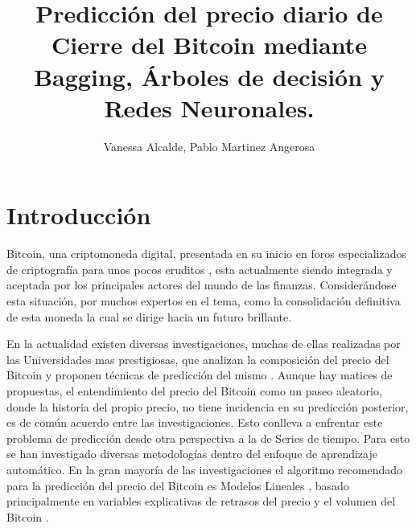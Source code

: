 \documentclass[a4paper,12pt,twocolumn]{article}
\date{ }
\title{\textbf{Predicción del precio diario de Cierre del Bitcoin mediante Bagging, Árboles de decisión y Redes Neuronales. }}
\author{Vanessa Alcalde, Pablo Martinez Angerosa}
\begin{document}
\setlength{\columnsep}{0.8cm}

\vspace{1.0cm}


\section{Introducción}
Bitcoin, una criptomoneda digital, presentada en su inicio en foros especializados de criptografía para unos pocos eruditos \cite{Satoshi}, esta actualmente siendo integrada y aceptada por los principales actores del mundo de las finanzas. Considerándose esta situación, por muchos expertos en el tema, como la consolidación definitiva de esta moneda la cual se dirige hacia un futuro brillante. 

En la actualidad existen diversas investigaciones, muchas de ellas realizadas por las Universidades mas prestigiosas, que analizan la composición del precio del Bitcoin y proponen técnicas de predicción del mismo \cite{mainDriversBitcoin}. Aunque hay matices de propuestas, el entendimiento del precio del Bitcoin como un paseo aleatorio, donde la historia del propio precio, no tiene incidencia en su predicción posterior, es de común acuerdo entre las investigaciones. Esto conlleva a enfrentar este problema de predicción desde otra perspectiva a la de Series de tiempo. Para esto se han investigado diversas metodologías dentro del enfoque de aprendizaje automático. En la gran mayoría de las investigaciones el algoritmo recomendado para la predicción del precio del Bitcoin es Modelos Lineales  \cite{regression_for_bitcoin_price}, basado principalmente en variables explicativas de retrasos del precio y el volumen del Bitcoin  \cite{forecastinBitcoinClosing}.  
\end{document}
